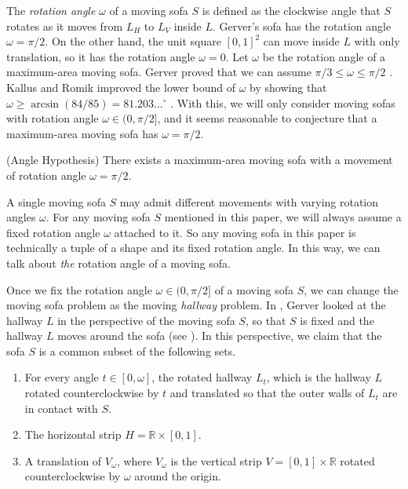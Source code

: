 The \emph{rotation angle} \(\omega\) of a moving sofa \(S\) is defined as the clockwise angle that \(S\) rotates as it moves from \(L_H\) to \(L_V\) inside \(L\). Gerver’s sofa has the rotation angle \(\omega = \pi/2\). On the other hand, the unit square \([0, 1]^2\) can move inside \(L\) with only translation, so it has the rotation angle \(\omega = 0\). Let \(\omega\) be the rotation angle of a maximum-area moving sofa. Gerver proved that we can assume \(\pi/ 3 \leq \omega \leq \pi/2\) \autocite{gerverMovingSofaCorner1992}. Kallus and Romik improved the lower bound of \(\omega\) by showing that \(\omega \geq \arcsin(84/85) = 81.203\dots^\circ\) \autocite{kallusImprovedUpperBounds2018}. With this, we will only consider moving sofas with rotation angle \(\omega \in (0, \pi/2]\), and it seems reasonable to conjecture that a maximum-area moving sofa has \(\omega = \pi/2\).

\begin{conjecture}

(Angle Hypothesis) There exists a maximum-area moving sofa with a movement of rotation angle \(\omega = \pi/2\).

\label{con:angle}
\end{conjecture}

\begin{remark}

A single moving sofa \(S\) may admit different movements with varying rotation angles \(\omega\). For any moving sofa \(S\) mentioned in this paper, we will always assume a fixed rotation angle \(\omega\) attached to it. So any moving sofa in this paper is technically a tuple of a shape and its fixed rotation angle. In this way, we can talk about \emph{the} rotation angle of a moving sofa.

\label{rem:angle}
\end{remark}

Once we fix the rotation angle \(\omega \in (0, \pi/2]\) of a moving sofa \(S\), we can change the moving sofa problem as the moving \emph{hallway} problem. In \autocite{gerverMovingSofaCorner1992}, Gerver looked at the hallway \(L\) in the perspective of the moving sofa \(S\), so that \(S\) is fixed and the hallway \(L\) moves around the sofa (see ). In this perspective, we claim that the sofa \(S\) is a common subset of the following sets.

\begin{enumerate}
\def\labelenumi{\arabic{enumi}.}
\tightlist
\item
  For every angle \(t \in [0, \omega]\), the rotated hallway \(L_t\), which is the hallway \(L\) rotated counterclockwise by \(t\) and translated so that the outer walls of \(L_t\) are in contact with \(S\).
\item
  The horizontal strip \(H = \mathbb{R} \times [0, 1]\).
\item
  A translation of \(V_\omega\), where \(V_\omega\) is the vertical strip \(V = [0, 1] \times \mathbb{R}\) rotated counterclockwise by \(\omega\) around the origin.
\end{enumerate}

